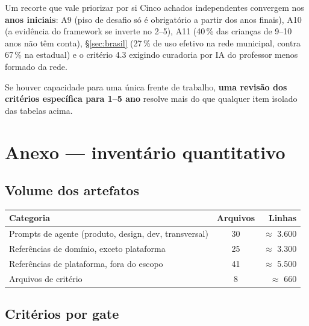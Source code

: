 \documentclass[11pt,a4paper]{article}
\begin{document}
\begin{notabox}{Um recorte que vale priorizar por si}
Cinco achados independentes convergem nos \textbf{anos iniciais}: A9 (piso de desafio s\'o \'e
obrigat\'orio a partir dos anos finais), A10 (a evid\^encia do framework se inverte no
2\textordmasculine{}--5\textordmasculine{}), A11 (40\,\% das crian\c{c}as de 9--10 anos n\~ao t\^em
conta), \S\ref{sec:brasil} (27\,\% de uso efetivo na rede municipal, contra 67\,\% na estadual) e o
crit\'erio 4.3 exigindo curadoria por IA do professor menos formado da rede.

Se houver capacidade para uma \'unica frente de trabalho, \textbf{uma revis\~ao dos crit\'erios
espec\'ifica para 1\textordmasculine{}--5\textordmasculine{} ano} resolve mais do que qualquer
item isolado das tabelas acima.
\end{notabox}

\section{Anexo --- invent\'ario quantitativo}

\subsection{Volume dos artefatos}

\begin{center}
\begin{tabular}{@{}l c r@{}}
\toprule
\textbf{Categoria} & \textbf{Arquivos} & \textbf{Linhas} \\
\midrule
Prompts de agente (produto, design, dev, transversal) & 30 & $\approx$ 3.600 \\
Refer\^encias de dom\'inio, exceto plataforma & 25 & $\approx$ 3.300 \\
Refer\^encias de plataforma, fora do escopo & 41 & $\approx$ 5.500 \\
Arquivos de crit\'erio & 8 & $\approx$ 660 \\
\bottomrule
\end{tabular}
\end{center}

\subsection{Crit\'erios por gate}
\end{document}

